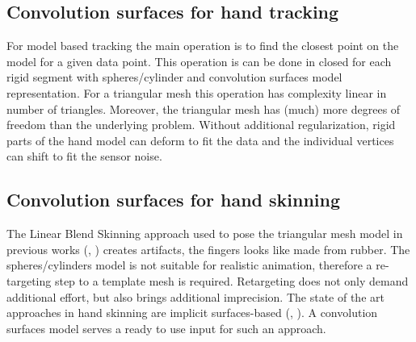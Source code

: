 \subsection{Convolution surfaces for hand tracking}
For model based tracking the main operation is to find the closest point on the model for a given data point. This operation is can be done in closed for each rigid segment with spheres/cylinder and convolution surfaces model representation. For a triangular mesh this operation has complexity linear in number of triangles. Moreover, the triangular mesh has (much) more degrees of freedom than the underlying problem. Without additional regularization, rigid parts of the hand model can deform to fit the data and the individual vertices can shift to fit the sensor noise.

\subsection{Convolution surfaces for hand skinning}
The Linear Blend Skinning approach used to pose the triangular mesh model in previous works (\cite{sharp2015accurate}, \cite{schroder2013analysis} ) creates artifacts, the fingers looks like made from rubber. The spheres/cylinders model is not suitable for realistic animation, therefore a re-targeting step to a template mesh is required. Retargeting does not only demand additional effort, but also brings additional imprecision. The state of the art approaches in hand skinning are implicit surfaces-based (\cite{vaillant2013implicit},  \cite{vaillant2014robust} ).  A convolution surfaces model serves a ready to use input for such an approach.